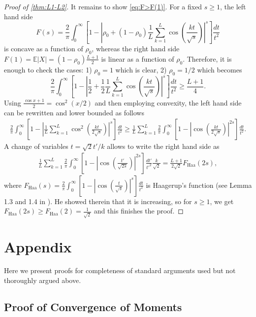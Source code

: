 \documentclass[10pt]{article}
\newcommand{\E}{\mathbb{E}}
\newcommand{\1}{\textbf{1}}
\theoremstyle{remark}
\theoremstyle{definition}
\begin{document}
\begin{proof}[Proof of \ref{thm:L1-L2}]
It remains to show \eqref{eq:F>F(1)}. For a fixed $s \geq 1$, the left hand side
\[
F(s) = \frac{2}{\pi}\int_0^\infty\left[1 - \left|\rho_0 + (1-\rho_0)\frac{1}{L}\sum_{k=1}^L \cos\left(\frac{kt}{\sqrt{s}}\right)\right|^s\right]\frac{dt}{t^2}
\]
is concave as a function of $\rho_0$, whereas the right hand side $F(1) = \E|X| = (1-\rho_0)\frac{L+1}{2}$ is linear as a function of $\rho_0$. Therefore, it is enough to check the cases: 1) $\rho_0 = 1$ which is clear, 2) $\rho_0 = 1/2$ which becomes
\[
\frac{2}{\pi}\int_0^\infty\left[1 - \left|\frac{1}{2} + \frac{1}{2}\frac{1}{L}\sum_{k=1}^L \cos\left(\frac{kt}{\sqrt{s}}\right)\right|^s\right]\frac{dt}{t^2} \geq \frac{L+1}{4}.
\]
Using $\frac{\cos x +1}{2} = \cos^2(x/2)$ and then employing convexity, the left hand side can be rewritten and lower bounded as follows
\begin{align*}
\frac{2}{\pi}\int_0^\infty\left[1 - \left|\frac{1}{L}\sum_{k=1}^L \cos^2\left(\frac{kt}{2\sqrt{s}}\right)\right|^s\right]\frac{dt}{t^2} \geq \frac{1}{L}\sum_{k=1}^L\frac{2}{\pi}\int_0^\infty\left[1 - \left|\cos\left(\frac{kt}{2\sqrt{s}}\right)\right|^{2s}\right]\frac{dt}{t^2}.
\end{align*}
A change of variables $t = \sqrt{2}t'/k$ allows to write the right hand side as
\begin{align*}
\frac{1}{L}\sum_{k=1}^L\frac{2}{\pi}\int_0^\infty\left[1 - \left|\cos\left(\frac{t'}{\sqrt{2s}}\right)\right|^{2s}\right]\frac{dt'}{t'^2}\frac{k}{\sqrt{2}} = \frac{L+1}{2\sqrt{2}}F_{\text{Haa}}(2s),
\end{align*}
where $F_{\text{Haa}}(s) = \frac{2}{\pi}\int_0^\infty\left[1 - \left|\cos\left(\frac{t}{\sqrt{s}}\right)\right|^{s}\right]\frac{dt}{t^2}$ is Haagerup's function (see Lemma 1.3 and 1.4 in \cite{H}). He showed therein that it is increasing, so for $s \geq 1$, we get $F_{\text{Haa}}(2s) \geq F_{\text{Haa}}(2) = \frac{1}{\sqrt{2}}$ and this finishes the proof.
\end{proof}

\newpage

\section{Appendix}

Here we present proofs for completeness of standard arguments used but not thoroughly argued above.

\subsection{Proof of Convergence of Moments}
\end{document}
